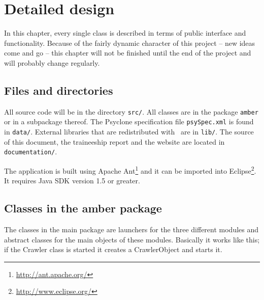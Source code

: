 \chapter{Detailed design}

In this chapter, every single class is described in terms of public interface
and functionality. Because of the fairly dynamic character of this project --
new ideas come and go -- this chapter will not be finished until the end of the
project and will probably change regularly.

\section{Files and directories}

All source code will be in the directory \texttt{src/}. All classes are in the
package \texttt{amber} or in a subpackage thereof. The Psyclone specification
file \texttt{psySpec.xml} is found in \texttt{data/}. External libraries that
are redistributed with \Amber\ are in \texttt{lib/}. The source of this
document, the traineeship report and the website are located in
\texttt{documentation/}.

The application is built using Apache
Ant\footnote{\url{http://ant.apache.org/}} and it can be imported into
Eclipse\footnote{\url{http://www.eclipse.org/}}. It requires Java SDK version
1.5 or greater.

\section{Classes in the amber package}

The classes in the main package are launchers for the three different modules
and abstract classes for the main objects of these modules. Basically it works
like this; if the Crawler class is started it creates a CrawlerObject and
starts it.


\begin{classmetadata}
\end{classmetadata}

\begin{classinterface}
\end{classinterface}




\begin{classmetadata}
\end{classmetadata}


